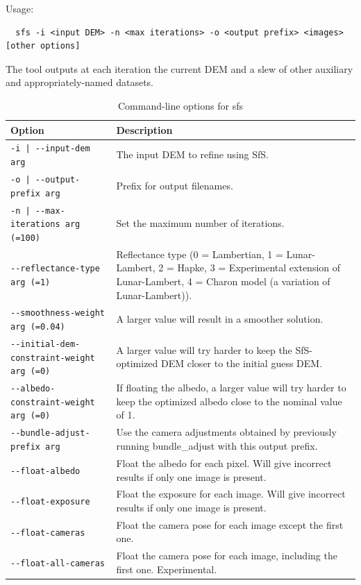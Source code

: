 Usage:
\begin{verbatim}
  sfs -i <input DEM> -n <max iterations> -o <output prefix> <images> [other options]
\end{verbatim}

The tool outputs at each iteration the current DEM and a slew of other auxiliary and 
appropriately-named datasets.

\begin{longtable}{|l|p{7.5cm}|}
\caption{Command-line options for sfs}
\label{tbl:sfs}
\endfirsthead
\endhead
\endfoot
\endlastfoot
\hline
Option & Description \\ \hline \hline
\texttt{-i | -\/-input-dem  arg} & The input DEM to refine using SfS.\\ \hline
\texttt{-o | -\/-output-prefix  arg} & Prefix for output filenames.\\ \hline
\texttt{-n | -\/-max-iterations  arg (=100)} & Set the maximum number of iterations.\\ \hline
\texttt{-\/-reflectance-type arg (=1)} & Reflectance type (0 = Lambertian, 1 = Lunar-Lambert, 2 = Hapke, 3 = Experimental extension of Lunar-Lambert, 4 = Charon model (a variation of Lunar-Lambert)).\\ \hline
\texttt{-\/-smoothness-weight arg (=0.04)} & A larger value will result in a smoother solution.\\ \hline
\texttt{-\/-initial-dem-constraint-weight arg (=0)} & A larger value will try harder to keep the SfS-optimized DEM closer to the initial guess DEM.\\ \hline
\texttt{-\/-albedo-constraint-weight arg (=0)} & If floating the albedo, a larger value will try harder to keep the optimized albedo close to the nominal value of 1.\\ \hline
\texttt{-\/-bundle-adjust-prefix arg} & Use the camera adjustments obtained by previously running bundle\_adjust with this output prefix.\\ \hline
\texttt{-\/-float-albedo} & Float the albedo for each pixel. Will give incorrect results if only one image is present.\\ \hline
\texttt{-\/-float-exposure} & Float the exposure for each image. Will give incorrect results if only one image is present.\\ \hline
\texttt{-\/-float-cameras} & Float the camera pose for each image except the first one.\\ \hline
\texttt{-\/-float-all-cameras} & Float the camera pose for each image, including the first one. Experimental.\\ \hline

\end{longtable}
